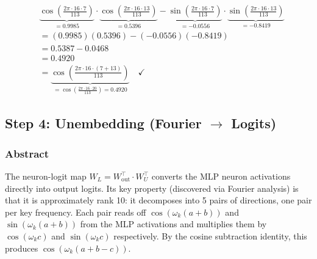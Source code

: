 \documentclass[11pt,a4paper]{article}
\begin{document}
\begin{align*}
    &\underbrace{\cos\!\left(\frac{2\pi \cdot 16 \cdot 7}{113}\right)}_{= 0.9985} \cdot \underbrace{\cos\!\left(\frac{2\pi \cdot 16 \cdot 13}{113}\right)}_{= 0.5396} - \underbrace{\sin\!\left(\frac{2\pi \cdot 16 \cdot 7}{113}\right)}_{= -0.0556} \cdot \underbrace{\sin\!\left(\frac{2\pi \cdot 16 \cdot 13}{113}\right)}_{= -0.8419} \\
    &= (0.9985)(0.5396) - (-0.0556)(-0.8419) \\
    &= 0.5387 - 0.0468 \\
    &= 0.4920 \\
    &= \underbrace{\cos\!\left(\frac{2\pi \cdot 16 \cdot (7+13)}{113}\right)}_{= \cos\!\left(\frac{2\pi \cdot 16 \cdot 20}{113}\right) = 0.4920} \quad \checkmark
\end{align*}

\subsection{Step 4: Unembedding (Fourier $\to$ Logits)}

\subsubsection*{Abstract}
The neuron-logit map $W_L = W_{\text{out}}^\top \cdot W_U^\top$ converts the MLP neuron activations directly into output logits. Its key property (discovered via Fourier analysis) is that it is approximately rank 10: it decomposes into 5 pairs of directions, one pair per key frequency. Each pair reads off $\cos(\omega_k(a+b))$ and $\sin(\omega_k(a+b))$ from the MLP activations and multiplies them by $\cos(\omega_k c)$ and $\sin(\omega_k c)$ respectively. By the cosine subtraction identity, this produces $\cos(\omega_k(a+b-c))$.
\end{document}
